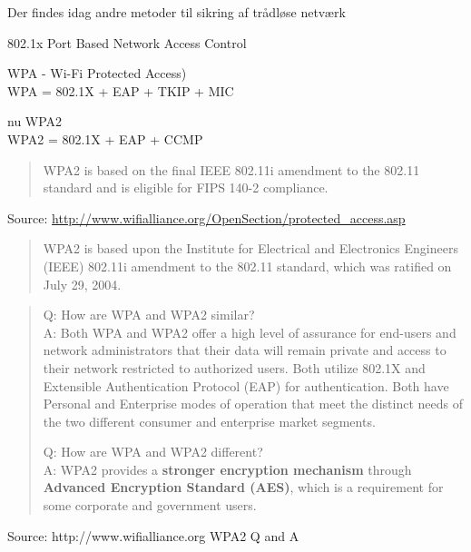 \documentclass[20pt,landscape,a4paper,footrule]{foils}
\begin{document}
\begin{list1}
\item Der findes idag andre metoder til sikring af trådløse netværk
\item 802.1x Port Based Network Access Control
\item WPA - Wi-Fi Protected Access)\\
WPA = 802.1X + EAP + TKIP + MIC
\item nu WPA2\\
WPA2 = 802.1X + EAP + CCMP

\begin{quote}
WPA2 is based on the final IEEE 802.11i amendment to the 802.11
standard and is eligible for FIPS 140-2 compliance.
\end{quote}
\item Source:
\href{http://www.wifialliance.org/OpenSection/protected_access.asp}
{http://www.wifialliance.org/OpenSection/protected\_access.asp}
\end{list1}



\begin{quote}
WPA2 is based upon the Institute for Electrical and Electronics
Engineers (IEEE) 802.11i amendment to the 802.11 standard, which was
ratified on July 29, 2004.
\end{quote}

\begin{quote}
Q: How are WPA and WPA2 similar?\\
A: Both WPA and WPA2 offer a high level of assurance for end-users and network
administrators that their data will remain private and access to their
network restricted to authorized users.
Both utilize 802.1X and Extensible Authentication Protocol (EAP) for
authentication. Both have Personal and Enterprise modes of operation
that meet the distinct needs of the two different consumer and
enterprise market segments.

Q: How are WPA and WPA2 different?\\
A: WPA2 provides a {\bf stronger encryption mechanism} through {\bf
  Advanced Encryption Standard (AES)}, which is a requirement for some
corporate and government users.
\end{quote}

\centerline{Source: http://www.wifialliance.org WPA2 Q and A}

\end{document}
